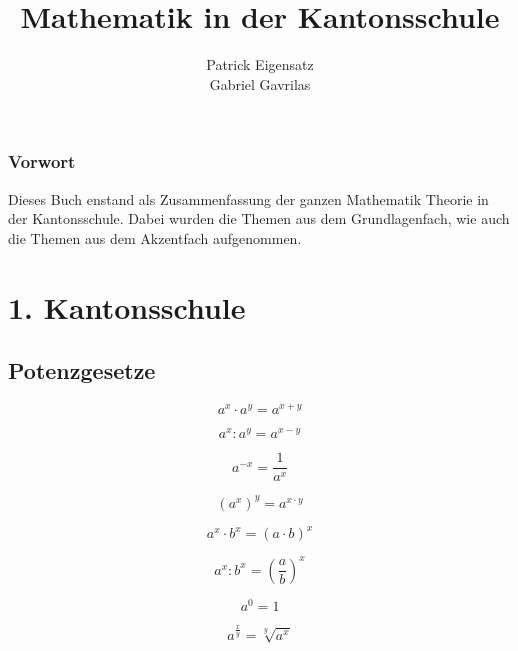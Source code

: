 \documentclass[12pt,a4paper]{scrbook}
\author{Patrick Eigensatz\\Gabriel Gavrilas}
\title{Mathematik in der Kantonsschule}
\begin{document}

\maketitle
\section*{Vorwort}
Dieses Buch enstand als Zusammenfassung der ganzen Mathematik Theorie in der Kantonsschule.
Dabei wurden die Themen aus dem Grundlagenfach, wie auch die Themen aus dem Akzentfach
aufgenommen.

\makeatletter
\renewcommand*\cleardoublepage{\clearpage\if@twoside
  \ifodd\c@page \hbox{}\newpage\if@twocolumn\hbox{}%
  \newpage\fi\fi\fi}
\makeatother

\tableofcontents
\newpage

\part{1. Kantonsschule}

\chapter{Potenzgesetze}
\begin{equation}
a^x \cdot a^y = a^{x+y}
\end{equation}

\begin{equation}
a^x : a^y = a^{x-y}
\end{equation}

\begin{equation}
a^{-x} = \frac{1}{a^x}
\end{equation}

\begin{equation}
(a^x)^y = a^{x\cdot y}
\end{equation}

\begin{equation}
a^x \cdot b^x = (a \cdot b)^x
\end{equation}

\begin{equation}
a^x : b^x = \left( \frac{a}{b} \right)^x
\end{equation}

\begin{equation}
a^0 = 1
\end{equation}

\begin{equation}
a^{\frac{x}{y}} = \sqrt[y]{a^x}
\end{equation}
\end{document}
